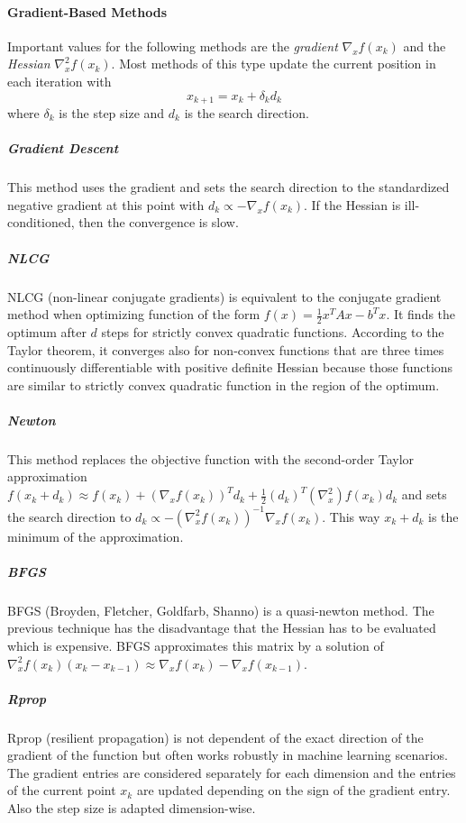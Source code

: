 \paragraph{Gradient-Based Methods}
Important values for the following methods are the \textit{gradient} $ \nabla_x f\left(x_k\right) $ and the \textit{Hessian} $ \nabla_x^2 f\left(x_k\right) $. Most methods of this type update the current position in each iteration with 
\begin{equation}
	x_{k+1} = x_k + \delta_k d_k 	
\end{equation}
where $ \delta_k $ is the step size and $ d_k $ is the search direction.

\subparagraph{Gradient Descent}
This method uses the gradient and sets the search direction to the standardized negative gradient at this point with $ d_k \propto -\nabla_x f(x_k) $. If the Hessian is ill-conditioned, then the convergence is slow. 

\subparagraph{NLCG}
NLCG (non-linear conjugate gradients) is equivalent to the conjugate gradient method when optimizing function of the form $ f(x) = \frac{1}{2} x^T A x - b^T x $. It finds the optimum after $ d $ steps for strictly convex quadratic functions. According to the Taylor theorem, it converges also for non-convex functions that are three times continuously differentiable with positive definite Hessian because those functions are similar to strictly convex quadratic function in the region of the optimum.

\subparagraph{Newton}
This method replaces the objective function with the second-order Taylor approximation $ f\left(x_k + d_k\right) \approx f\left(x_k\right) + \left(\nabla_x f\left(x_k\right)\right)^T d_k + \frac{1}{2}\left(d_k\right)^T\left(\nabla_x^2\right) f\left(x_k\right) d_k $ and sets the search direction to $ d_k \propto- \left( \nabla_x^2 f\left(x_k\right)\right)^{-1} \nabla_x f \left(x_k\right)$. This way $ x_k + d_k $ is the minimum of the approximation. 

\subparagraph{BFGS}
BFGS (Broyden, Fletcher, Goldfarb, Shanno) is a quasi-newton method. The previous technique has the disadvantage that the Hessian has to be evaluated which is expensive. BFGS approximates this matrix by a solution of $  \nabla_x^2 f\left(x_k\right) \left( x_k - x_{k-1} \right) \approx \nabla_x f\left(x_k\right) - \nabla_x f\left(x_{k-1}\right) $.

\subparagraph{Rprop}
Rprop (resilient propagation) is not dependent of the exact direction of the gradient of the function but often works robustly in machine learning scenarios. The gradient entries are considered separately for each dimension and the entries of the current point $ x_k $ are updated depending on the sign of the gradient entry. Also the step size is adapted dimension-wise. \newline 

